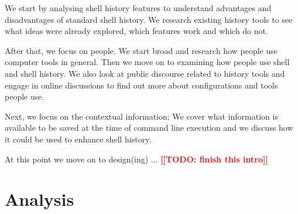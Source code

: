\documentclass[thesis=M,english]{FITthesis}[2012/10/20]
\newcommand{\todotext}[1]{\textcolor{red}{\textbf{[[#1]]}}}
\newcommand{\blind}[1][1]{\textcolor{mygray}{\Blindtext[#1][1]}}
\begin{document}
\begin{introduction}


 We start by analysing shell history features to understand advantages and disadvantages of standard shell history. We research existing history tools to see what ideas were already explored, which features work and which do not. 

After that, we focus on people. We start broad and research how people use computer tools in general. Then we move on to examining how people use shell and shell history. We also look at public discourse related to history tools and engage in online discussions to find out more about configurations and tools people use.

Next, we focus on the contextual information; We cover what information is available to be saved at the time of command line execution and we discuss how it could be used to enhance shell history. 

At this point we move on to design(ing) ...
\todotext{TODO: finish this intro}


\blind[2]

\end{introduction}






\chapter{Analysis}

\end{document}
